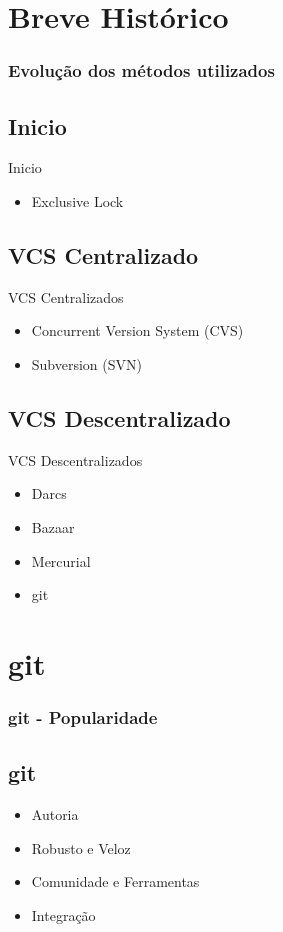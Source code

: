 \documentclass{beamer}
\begin{document}
  \section{Breve Histórico}
  \begin{frame}
    \frametitle{Evolução dos métodos utilizados}
    \subsection{Inicio}
    Inicio 
    \begin{itemize}
      \item Exclusive Lock
    \end{itemize}

    \subsection{VCS Centralizado}
    VCS Centralizados
    \begin{itemize}
      \item Concurrent Version System (CVS)
      \item Subversion (SVN)
    \end{itemize}
    \subsection{VCS Descentralizado}
    VCS Descentralizados
    \begin{itemize}
      \item Darcs 
      \item Bazaar 
      \item Mercurial 
      \item git 
    \end{itemize}
    \vfill
  \end{frame}

  \section{git}
  
  \begin{frame}
    \frametitle{git - Popularidade}
    \subsection{git}
    \begin{itemize}
      \item Autoria
      \item Robusto e Veloz
      \item Comunidade e Ferramentas
      \item Integração
    \end{itemize}
    \vfill
  \end{frame}
  
\end{document}
